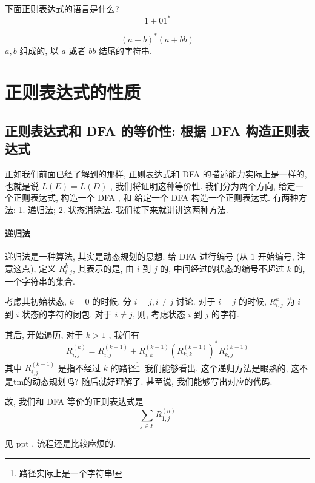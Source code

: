 \documentclass[../main_part1.tex]{subfiles}
\begin{document}
\begin{exam}
下面正则表达式的语言是什么? 
\begin{equation}
1 + 0 1 ^{* } 
\end{equation}
\end{exam}
\begin{exam}
\begin{equation}
(a+ b ) ^{*} (a + bb ) 
\end{equation}
\(a , b\) 组成的, 以 \(a\) 或者 \(bb\) 结尾的字符串. 
\end{exam}

\newpage 
\section{正则表达式的性质}%
\subsection{正则表达式和 DFA 的等价性: 根据 DFA 构造正则表达式}

正如我们前面已经了解到的那样, 正则表达式和 DFA 的描述能力实际上是一样的, 也就是说 \(L (E ) = L ( D) \) , 我们将证明这种等价性. 我们分为两个方向, 给定一个正则表达式, 构造一个 DFA , 和 给定一个 DFA 构造一个正则表达式.   有两种方法: 1. 递归法; 2. 状态消除法. 我们接下来就讲讲这两种方法. 
\paragraph{递归法}
递归法是一种算法, 其实是动态规划的思想. 给 DFA 进行编号 (从 \(1\) 开始编号, 注意这点), 定义 \(R _{i , j} ^{k}\), 其表示的是, 由 \(i\) 到 \(j\) 的, 中间经过的状态的编号不超过 \(k\) 的, 一个字符串的集合. 

考虑其初始状态, \(k = 0\) 的时候, 分 \(i = j , i \ne j \) 讨论. 对于 \(i =j \) 的时候, \(R ^{k} _{i, j}\) 为 \(i\) 到 \(i\) 状态的字符的闭包. 对于 \(i \ne j\), 则, 考虑状态 \(i\) 到 \(j\) 的字符.

其后, 开始遍历, 对于 \(k > 1 \) , 我们有
\begin{equation}
R _{i , j } ^{ (k ) } =  R_{i, j} ^{ (k - 1)} + R _{i , k} ^{(k - 1) } ( R _{k , k} ^{ (k -1  )} ) ^{*} R _{k , j} ^{ (k - 1) }
\end{equation}
其中 \(R _{i, j} ^{ (k -1) }\) 是指不经过 \(k\) 的路径\footnote{路径实际上是一个字符串!}. 我们能够看出, 这个递归方法是眼熟的, 这不是tm的动态规划吗? 随后就好理解了.  甚至说, 我们能够写出对应的代码. 

故, 我们和 DFA 等价的正则表达式是
\begin{equation}
\sum _{j \in F} R _{1, j} ^{(n)}
\end{equation}
\begin{exam}
见 ppt , 流程还是比较麻烦的.
\end{exam}
\end{document}
